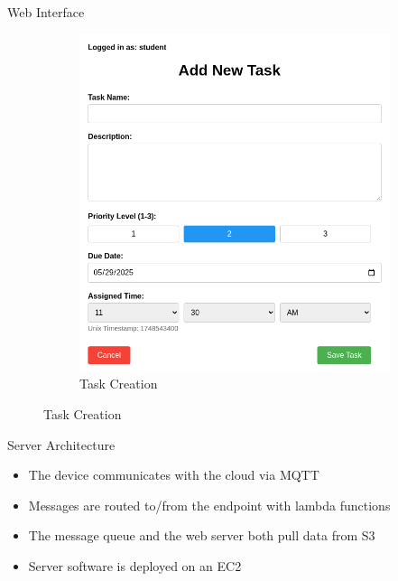 \documentclass[final]{beamer}
\newlength{\colwidth}
\begin{document}
\begin{frame}[t]
\begin{columns}[t]
\begin{column}{\colwidth}
\begin{block}{Web Interface}
\begin{figure}
\begin{subfigure}{0.49\textwidth}
            \includegraphics[width = \textwidth]{web_addtask.png}
            \caption{Task Creation}
          \end{subfigure}
        \end{figure}
      \end{block}

      \begin{block}{Server Architecture}

        \begin{itemize}
          \item The device communicates with the cloud via MQTT
          \item Messages are routed to/from the endpoint with lambda functions
          \item The message queue and the web server both pull data from S3
          \item Server software is deployed on an EC2 
        \end{itemize}

      \end{block}

    \end{column}


\end{columns}
\end{frame}
\end{document}

